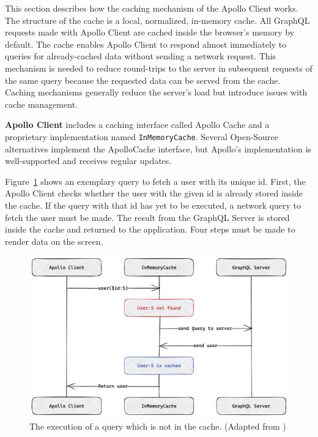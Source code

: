 This section describes how the caching mechanism of the Apollo Client works. The structure of the cache is a local, normalized, in-memory cache. All GraphQL requests made with Apollo Client are cached inside the browser's memory by default. The cache enables Apollo Client to respond almost immediately to queries for already-cached data without sending a network request. This mechanism is needed to reduce round-trips to the server in subsequent requests of the same query because the requested data can be served from the cache. \cite{misc:-:background:graphql:apollo-client-cache-overview} Caching mechanisms generally reduce the server's load but introduce issues with cache management.

\bigskip

\noindent \textbf{Apollo Client} includes a caching interface called Apollo Cache and a proprietary implementation named \texttt{InMemoryCache}. Several Open-Source alternatives implement the ApolloCache interface, but Apollo's implementation is well-supported and receives regular updates.

\bigskip

\noindent Figure~\ref{fig:background:graphql:user-query-first-time} shows an exemplary query to fetch a user with its unique id. First, the Apollo Client checks whether the user with the given id is already stored inside the cache. If the query with that id has yet to be executed, a network query to fetch the user must be made. The result from the GraphQL Server is stored inside the cache and returned to the application. Four steps must be made to render data on the screen. \cite{misc:-:background:graphql:apollo-client-cache-overview}

\ifshowImages
\begin{figure}[H]
    \centering
    \includegraphics[width=0.6\linewidth]{images/background/graphql/apollo/apollo-client-basic-cache.jpg}
    \caption{The execution of a query which is not in the cache. (Adapted from \cite{misc:-:background:graphql:apollo-client-cache-overview})}\label{fig:background:graphql:user-query-first-time}
\end{figure}
\fi


